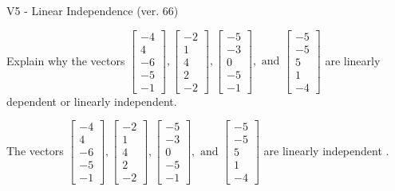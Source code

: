 \begin{exercise}
  \begin{exerciseTitle}V5 - Linear Independence (ver. 66)\end{exerciseTitle}
  \begin{exerciseStatement}
    Explain why the vectors \(\left[\begin{array}{r}
-4 \\
4 \\
-6 \\
-5 \\
-1
\end{array}\right] , \left[\begin{array}{r}
-2 \\
1 \\
4 \\
2 \\
-2
\end{array}\right] , \left[\begin{array}{r}
-5 \\
-3 \\
0 \\
-5 \\
-1
\end{array}\right] , \text{ and } \left[\begin{array}{r}
-5 \\
-5 \\
5 \\
1 \\
-4
\end{array}\right]\) are linearly dependent or linearly independent.	


  \end{exerciseStatement}
  \begin{exerciseAnswer}
   The vectors \(\left[\begin{array}{r}
-4 \\
4 \\
-6 \\
-5 \\
-1
\end{array}\right] , \left[\begin{array}{r}
-2 \\
1 \\
4 \\
2 \\
-2
\end{array}\right] , \left[\begin{array}{r}
-5 \\
-3 \\
0 \\
-5 \\
-1
\end{array}\right] , \text{ and } \left[\begin{array}{r}
-5 \\
-5 \\
5 \\
1 \\
-4
\end{array}\right]\) are 
  	 linearly independent  .
  


  \end{exerciseAnswer}
\end{exercise}